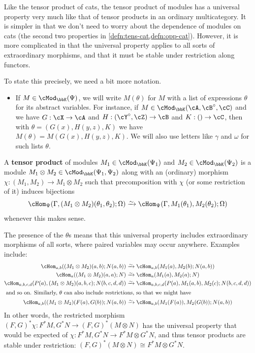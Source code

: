 \documentclass{amsart}
\newcommand{\A}{\cA}
\newcommand{\B}{\cB}
\newcommand{\C}{\cC}
\newcommand{\X}{\cX}
\newcommand{\Y}{\cY}
\newcommand{\Z}{\cZ}
\newcommand{\K}{\bbK}
\let\mod\cMod
\def\modk{\mod_\K}
\renewcommand{\o}{^{\circ}}
\def\mhomv#1#2#3{\cHom_{#1}(#2;#3)}
\begin{document}
Like the tensor product of cats, the tensor product of modules has a universal property very much like that of tensor products in an ordinary multicategory.
It is simpler in that we don't need to worry about the dependence of modules on cats (the second two properties in \cref{defn:tens-cat,defn:opp-cat}).
However, it is more complicated in that the universal property applies to all sorts of extraordinary morphisms, and that it must be stable under restriction along functors.

To state this precisely, we need a bit more notation.
\begin{itemize}
\item If $M\in\modk(\Psi)$, we will write $M(\theta)$ for $M$ with a list of expressions $\theta$ for its abstract variables.
  For instance, if $M\in\modk(\A,\B\o,\C)$ and we have $G:\X \to \A$ and $H:(\Y\o,\Z)\to \B$ and $K:()\to \C$, then with $\theta=(G(x),H(y,z),K)$ we have $M(\theta) = M(G(x),H(y,z),K)$.
  We will also use letters like $\gamma$ and $\omega$ for such lists $\theta$.
\end{itemize}

\begin{defn}
  A \textbf{tensor product} of modules $M_1\in\modk(\Psi_1)$ and $M_2\in\modk(\Psi_2)$ is a module $M_1\otimes M_2 \in \modk(\Psi_1,\Psi_2)$ along with an (ordinary) morphism $\chi:(M_1,M_2)\to M_1\otimes M_2$ such that precomposition with $\chi$ (or some restriction of it) induces bijections
  \[ \mhomv{\Psi}{\Gamma,(M_1\otimes M_2)(\theta_1,\theta_2)}{\Omega} \toiso \mhomv{\Psi}{\Gamma,M_1(\theta_1),M_2(\theta_2)}{\Omega} \]
  whenever this makes sense.
\end{defn}

The presence of the $\theta$s means that this universal property includes extraordinary morphisms of all sorts, where paired variables may occur anywhere.
Examples include:
\begin{align*}
  \mhomv{a,b}{(M_1 \otimes M_2)(a,b)}{N(a,b)} &\toiso \mhomv{a,b}{M_1(a), M_2(b)}{N(a,b)}\\
  \mhomv{a}{(M_1 \otimes M_2)(a,a)}{N} &\toiso \mhomv{a}{M_1(a), M_2(a)}{N}\\
  \mhomv{a,b,c,d}{P(a),(M_1 \otimes M_2)(a,b,c)}{N(b,c,d,d)} &\toiso \mhomv{a,b,c,d}{P(a),M_1(a,b), M_2(c)}{N(b,c,d,d)}\\
\intertext{
and so on.
Similarly, $\theta$ can also include restrictions, so that we might have}
  \mhomv{a,b}{(M_1\otimes M_2)(F(a),G(b))}{N(a,b)} &\toiso \mhomv{a,b}{M_1(F(a)),M_2(G(b))}{N(a,b)}
\end{align*}
In other words, the restricted morphism $(F,G)^*\chi : F^*M, G^*N \to (F,G)^*(M\otimes N)$ has the universal property that would be expected of $\chi: F^*M, G^*N \to F^*M \otimes G^*N$, and thus tensor products are stable under restriction: $ (F,G)^*(M\otimes N) \cong  F^*M \otimes G^*N$.
\end{document}

